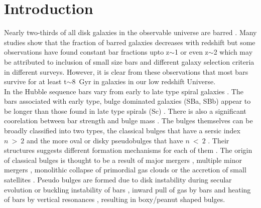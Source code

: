 \documentclass[a4paper,fleqn,usenatbib,useAMS]{mnras}
\begin{document}
\section{Introduction}
Nearly two-thirds of all disk galaxies in the observable universe are barred \citep{3,4a,1,2,4}. Many studies show that the fraction of barred galaxies decreases with redshift \citep{22,23,melvin.etal.2014} but some observations have found constant bar fractions upto z$\sim$1 \citep{5,5a,6} or even z$\sim$2 \citep{simmons.etal.2014} which may be attributed to inclusion of small size bars and different galaxy selection criteria in different surveys. However, it is clear from these observations that most bars survive for at least t$\sim$8~Gyr in galaxies in our low redshift Universe. \\

In the Hubble sequence bars vary from early to late type spiral galaxies \citep{1998gaas.book.....B,6a,6b}. The bars associated with early type, bulge dominated galaxies (SBa, SBb) appear to be longer than those found in late type spirals (Sc) \citep{erwin.2005}. There is also a significant coorelation between bar strength and bulge mass \citep{31,30a,32}.
The bulges themselves can be broadly classified into two types, the classical bulges that have a sersic index $n~>~2$ and the more oval or disky pseudobulges that have $n~<~2$ \citep{fisher.drory.2008}.
Their structures suggests different formation mechanisms for each of them \citep{gadotti.etal.2009}. The origin of classical bulges is thought to be a result of major mergers \citep{35,36,37,38}, multiple minor mergers \citep{39,40}, monolithic collapse of primordial gas clouds \citep{41} or the accretion of small satellites \citep{42}. Pseudo bulges are formed due to disk instability during secular evolution \citep{42b,42c} or buckling instability of bars \citep{combes.1990, raha.etal.1991,Martinez.2006}, inward pull of gas by bars \citep{13a} and heating of bars by vertical resonances \citep{33}, resulting in boxy/peanut shaped bulges.  
\end{document}
